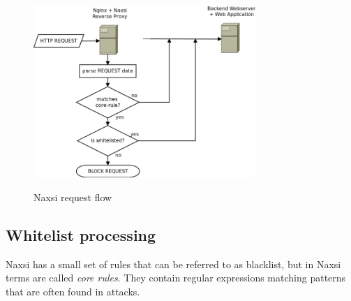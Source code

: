 \documentclass[Naxsi]{subfiles}
\begin{document}
\begin{figure}[h]
\caption{Naxsi request flow}
\centering
\includegraphics[width=0.75\textwidth] {images/request_flow.png}
\label{fig:naxsi_flow}
\end{figure}

\subsection{Whitelist processing}
\label{sec:naxsi_whitelist}
%
Naxsi has a small set of rules that can be referred to as blacklist, but in Naxsi terms are called \emph{core rules}. They contain regular expressions matching patterns that are often found in attacks.\\
\end{document}
